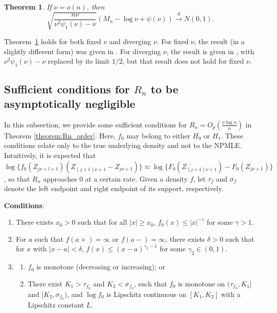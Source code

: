 \documentclass[12pt,letterpaper, twoside, openany]{article}
\theoremstyle{plain}
\newtheorem{theorem}{Theorem}[section]
\begin{document}
\begin{theorem}\label{thm:main_hist_asy_dist}
If $\nu = o(n)$, then
\begin{equation*}
	\sqrt{ \frac{n\nu}{\nu^2\psi_1(\nu)-\nu}} \left( M_n -  \log \nu +  \psi(\nu) \right) \stackrel{d}{\rightarrow} N(0, 1).
\end{equation*}
\end{theorem}

Theorem~\ref{thm:main_hist_asy_dist} holds for both fixed $\nu$ and diverging $\nu$.  For fixed $\nu$, the result (in a slightly different form) was given in \cite{del1976spacings}. For diverging $\nu$, the result is given in \cite{jammalamadaka1989asymptotic}, with $\nu^2 \psi_1(\nu) - \nu$ replaced by its limit $1/2$, but that result does not hold for fixed $\nu$.

\subsection{Sufficient conditions for $R_n$ to be asymptotically negligible}\label{sect:suff_cond}
In this subsection, we provide some sufficient conditions for $R_n = O_p( \frac{\nu \log n}{n})$ in Theorem \ref{theorem:Rn_order}.  Here, $f_0$ may belong to either $H_0$ or $H_1$.  These conditions relate only to the true underlying density and not to the NPMLE.  Intuitively, it is expected that  $\log \{f_0(Z_{j\nu+l+1})(Z_{(j+1)\nu+1} - Z_{j\nu+1})\} \approx \log \{F_0(Z_{(j+1)\nu+1}) - F_0(Z_{j\nu+1})\}$,  so that $R_n$ approaches $0$ at a certain rate.  Given a density $f$, let $\tau_f$ and $\sigma_f$ denote the left endpoint and right endpoint of its support, respectively.
 
\noindent
\textbf{Conditions}:
\begin{enumerate}
    \item[(A)] There exists $x_0 > 0$ such that for all $|x| \geq x_0$, $f_0(x) \leq |x|^{-\gamma}$ for some $\gamma > 1$.
    
    \item[(B)] 
    For $a$ such that $f(a+) = \infty$ or $f(a-) = \infty$, there exists $\delta > 0$ such that for $x$ with $|x-a| < \delta$, $f(x) \leq (x-a)^{\gamma_2 - 1}$ for some $\gamma_2 \in (0, 1)$.
    
    \item[(C)] 
    \begin{enumerate}%
	\item[(i)] $f_0$ is monotone (decreasing or increasing); or
	\item[(ii)] There exist $K_1 > \tau_{f_0} $ and $K_2 < \sigma_{f_0}$, such that $f_0$ is monotone on $(\tau_{f_0}, K_1]$ and $[K_2, \sigma_{f_0})$, and $\log f_0$ is Lipschitz continuous on $[K_1, K_2]$ with a Lipschitz constant $L$.
\end{enumerate}
\end{enumerate}
\end{document}

